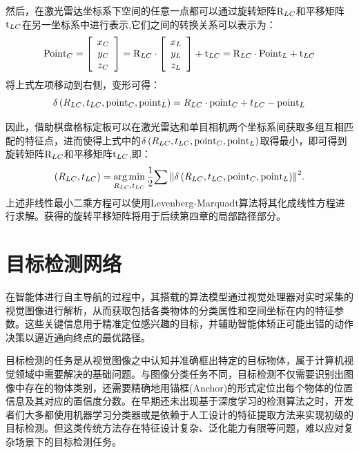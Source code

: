 然后，在激光雷达坐标系下空间的任意一点都可以通过旋转矩阵${\rm{R}}_{LC}$和平移矩阵${\rm{t}}_{LC}$在另一坐标系中进行表示,它们之间的转换关系可以表示为：
\begin{equation}
{\rm{Poin}}{{\rm{t}}_C} = \left[ {\begin{array}{*{20}{c}}
{{x_C}}\\
{{y_C}}\\
{{z_C}}
\end{array}} \right] = {{\rm{R}}_{LC}} \cdot \left[ {\begin{array}{*{20}{c}}
{{x_L}}\\
{{y_L}}\\
{{z_L}}
\end{array}} \right] + {{\rm{t}}_{LC}} = {{\rm{R}}_{LC}} \cdot {\rm{Poin}}{{\rm{t}}_L} + {{\rm{t}}_{LC}} 
    \label{myeq2}
\end{equation}
将上式左项移动到右侧，变形可得：
\begin{equation}
    \delta \left( {{R_{LC}},{t_{LC}},{\rm{poin}}{{\rm{t}}_C},{\rm{poin}}{{\rm{t}}_L}} \right) = {R_{LC}} \cdot {\rm{poin}}{{\rm{t}}_C} + {t_{LC}} - {\rm{poin}}{{\rm{t}}_L}
    \label{myeq3}
\end{equation}

因此，借助棋盘格标定板可以在激光雷达和单目相机两个坐标系间获取多组互相匹配的特征点，进而使得上式中的$\delta \left( {{R_{LC}},{t_{LC}},{\rm{poin}}{{\rm{t}}_C},{\rm{poin}}{{\rm{t}}_L}} \right)$取得最小，即可得到旋转矩阵${\rm{R}}_{LC}$和平移矩阵${\rm{t}}_{LC}$,即：
\begin{equation}
    \left( {{R_{LC}},{t_{LC}}} \right) = \mathop {\arg \min }\limits_{{R_{LC}},{t_{LC}}} \frac{1}{2}{\sum {\left\| {\delta \left( {{R_{LC}},{t_{LC}},{\rm{poin}}{{\rm{t}}_C},{\rm{poin}}{{\rm{t}}_L}} \right)} \right\|} ^2}.
    \label{myeq4}
\end{equation}
上述非线性最小二乘方程可以使用Levenberg-Marquadt算法\cite{more1977levenberg}将其化成线性方程进行求解。获得的旋转平移矩阵将用于后续第四章的局部路径部分。



\section{目标检测网络}
在智能体进行自主导航的过程中，其搭载的算法模型通过视觉处理器对实时采集的视觉图像进行解析，从而获取包括各类物体的分类属性和空间坐标在内的特征参数。这些关键信息用于精准定位感兴趣的目标，并辅助智能体矫正可能出错的动作决策以逼近通向终点的最优路径。


目标检测的任务是从视觉图像之中认知并准确框出特定的目标物体，属于计算机视觉领域中需要解决的基础问题。与图像分类任务不同，目标检测不仅需要识别出图像中存在的物体类别，还需要精确地用锚框(Anchor)的形式定位出每个物体的位置信息及其对应的置信度分数。在早期还未出现基于深度学习的检测算法之时，开发者们大多都使用机器学习分类器\cite{viola2001rapid}或是依赖于人工设计的特征提取方法来实现初级的目标检测。但这类传统方法存在特征设计复杂、泛化能力有限等问题，难以应对复杂场景下的目标检测任务。

